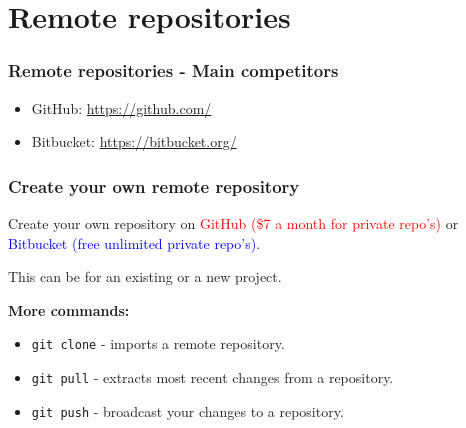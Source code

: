 %
%
\section{
  Remote repositories
}

%
%
\begin{frame}
  \frametitle{
    Remote repositories - Main competitors
  }

  \begin{itemize}%
  \item
    GitHub: \href{https://github.com/}{https://github.com/}
  \item
    Bitbucket: \href{https://bitbucket.org/}{https://bitbucket.org/}
  \end{itemize}
\end{frame}

%
%
\begin{frame}[fragile]
  \frametitle{
    Create your own remote repository
  }

  Create your own repository on \textcolor{red}{GitHub (\$7 a month for private repo's)} or \textcolor{blue}{Bitbucket (free unlimited private repo's)}.

  \bigskip  

  This can be for an existing or a new project.

  \bigskip
  
  {\bf More commands:}
  \begin{itemize}
  \item
    {\tt git clone} - imports a remote repository.
  \item
    {\tt git pull} - extracts most recent changes from a repository.
  \item
    {\tt git push} - broadcast your changes to a repository.
  \end{itemize}

\end{frame}


